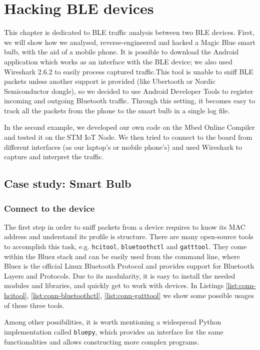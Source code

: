 \chapter{Hacking BLE devices}
\label{chapter3}
\thispagestyle{empty}

\noindent This chapter is dedicated to BLE traffic analysis between two BLE devices. First, we will show how we analysed, reverse-engineered and hacked a Magic Blue smart bulb, with the aid of a mobile phone. It is possible to download the Android application which works as an interface with the BLE device; we also used Wireshark 2.6.2 to easily process captured traffic.This tool is unable to sniff BLE packets unless another support is provided (like Ubertooth or Nordic Semiconductor dongle), so we decided to use Android Developer Tools to register incoming and outgoing Bluetooth traffic.
Through this setting, it becomes easy to track all the packets from the phone to the smart bulb in a single log file. 

In the second example, we developed our own code on the Mbed Online Compiler and tested it on the STM IoT Node. We then tried to connect to the board from different interfaces (as our laptop's or mobile phone's) and used Wireshark to capture and interpret the traffic.

\section{Case study: Smart Bulb}
\subsection{Connect to the device}

The first step in order to sniff packets from a device requires to know its MAC address and understand its profile is structure. There are many open-source tools to accomplish this task, e.g. \texttt{hcitool}, \texttt{bluetoothctl} and \texttt{gatttool}. They come within the Bluez stack and can be easily used from the command line, where Bluez is the official Linux Bluetooth Protocol and provides support for Bluetooth Layers and Protocols. Due to its modularity, it is easy to install the needed modules and libraries, and quickly get to work with devices. In Listings \ref{list:conn-hcitool}, \ref{list:conn-bluetoothctl}, \ref{list:conn-gatttool} we show some possible usages of these three tools.

Among other possibilities, it is worth mentioning a widespread Python implementation called \texttt{bluepy}, which provides an interface for the same functionalities and allows constructing more complex programs.

